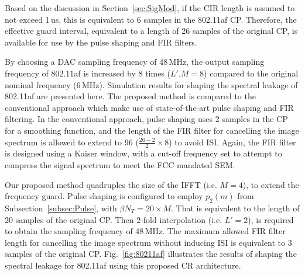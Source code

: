 Based on the discussion in Section~\ref{sec:SigMod}, if the CIR length is assumed to not exceed 1\,us, this is equivalent to 6 samples in the 802.11af CP.
Therefore, the effective guard interval, equivalent to a length of 26 samples of the original CP, is available for use by the pulse shaping and FIR filters.

By choosing a DAC sampling frequency of 48\,MHz, the output sampling frequency of 802.11af is increased by 8 times ($L'.M =8$) compared to the original nominal frequency (6\,MHz).
Simulation results for shaping the spectral leakage of 802.11af are presented here.
The proposed method is compared to the conventional approach which make use of state-of-the-art pulse shaping and FIR filtering.
In the conventional approach, pulse shaping uses 2 samples in the CP for a smoothing function, and the length of the FIR filter for cancelling the image spectrum is allowed to extend to 96 ($\frac{26-2}{2} \times 8$) to avoid ISI.
Again, the FIR filter is designed using a Kaiser window, with a cut-off frequency set to attempt to compress the signal spectrum to meet the FCC mandated SEM.

Our proposed method quadruples the size of the IFFT (i.e. $M=4$), to extend the frequency guard.
Pulse shaping is configured to employ $p_2(m)$ from Subsection~\ref{subsec:Pulse}, with $\beta N_{T}=20 \times M$. That is equivalent to the length of 20 samples of the original CP.
Then 2-fold interpolation (i.e. $L'=2$), is required to obtain the sampling frequency of 48\,MHz.
The maximum allowed FIR filter length for cancelling the image spectrum without inducing ISI is equivalent to 3 samples of the original CP.
Fig.~\ref{fig:80211af} illustrates the results of shaping the spectral leakage for 802.11af using this proposed CR architecture.

